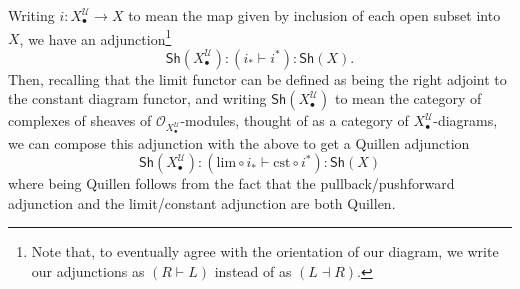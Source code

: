 \documentclass[11pt,fleqn]{article}
\theoremstyle{plain}
\theoremstyle{definition}
\theoremstyle{remark}
\numberwithin{equation}{theorem}
\newcommand{\cover}{\mathcal{U}}
\newcommand{\OO}{\mathcal{O}}
\newcommand{\cst}{\mathrm{cst}}
\newcommand{\gshX}{\mathsf{Sh}(X)}
\newcommand{\shX}{\mathsf{Sh}(\nerve{\bullet})}
\newcommand{\nerve}[1]{X_{#1}^\cover}
\begin{document}
        Writing $i\colon\nerve{\bullet}\to X$ to mean the map given by inclusion of each open subset into $X$, we have an adjunction\footnote{Note that, to eventually agree with the orientation of our diagram, we write our adjunctions as $(R\vdash L)$ instead of as $(L\dashv R)$.}
        \begin{equation*}
            \shX : (i_* \vdash i^*) : \gshX.
        \end{equation*}
        Then, recalling that the limit functor can be defined as being the right adjoint to the constant diagram functor, and writing $\shX$ to mean the category of complexes of sheaves of $\OO_{\nerve{\bullet}}$-modules, thought of as a category of $\nerve{\bullet}$-diagrams, we can compose this adjunction with the above to get a Quillen adjunction
        \begin{equation*}
            \shX : (\mathrm{lim}\circ i_* \vdash \cst\circ i^*) : \gshX
        \end{equation*}
        where being Quillen follows from the fact that the pullback/pushforward adjunction and the limit/constant adjunction are both Quillen.
\end{document}
